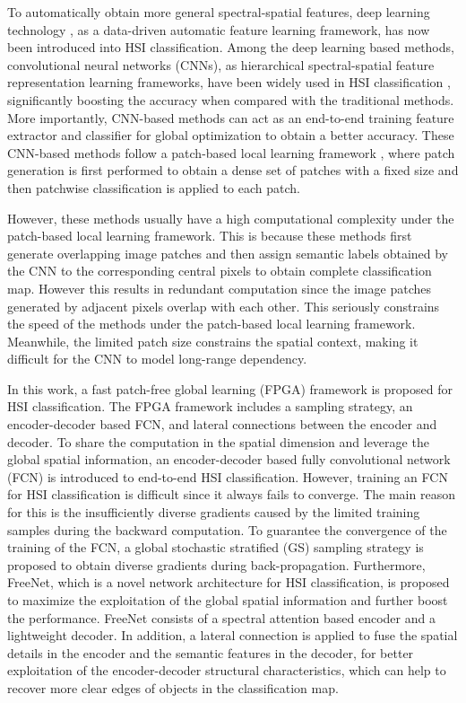 \documentclass[journal]{IEEEtran}
\begin{document}
To automatically obtain more general spectral-spatial features, deep learning technology \cite{lecun2015deep}, as a data-driven automatic feature learning framework, has now been introduced into HSI classification.
Among the deep learning based methods, convolutional neural networks (CNNs), as hierarchical spectral-spatial feature representation learning frameworks, have been widely used in HSI classification \cite{yue2015spectral, hu2015deep, chen2016deep,yu2017convolutional, paoletti2018new}, significantly boosting the accuracy when compared with the traditional methods.
More importantly, CNN-based methods can act as an end-to-end training feature extractor and classifier for global optimization to obtain a better accuracy.
These CNN-based methods follow a patch-based local learning framework \cite{chen2014deep, yue2015spectral,paoletti2018new, xu2018spectral, zhu2018deformable, gong2019cnn,hang2019cascaded}, where patch generation is first performed to obtain a dense set of patches with a fixed size  and then patchwise classification is applied to each patch.


However, these methods usually have a high computational complexity under the patch-based local learning framework.
This is because these methods first generate overlapping image patches and then assign semantic labels obtained by the CNN to the corresponding central pixels to obtain complete classification map.
However this results in redundant computation since the image patches generated by adjacent pixels overlap with each other.
This seriously constrains the speed of the methods under the patch-based local learning framework.
Meanwhile, the limited patch size constrains the spatial context, making it difficult for the CNN to model long-range dependency.



In this work, a fast patch-free global learning (FPGA) framework is proposed for HSI classification.
The FPGA framework includes a sampling strategy, an encoder-decoder based FCN, and lateral connections between the encoder and decoder.
To share the computation in the spatial dimension and leverage the global spatial information, an encoder-decoder based fully convolutional network (FCN) is introduced to end-to-end HSI classification.
However, training an FCN for HSI classification is difficult since it always fails to converge.
The main reason for this is the insufficiently diverse gradients caused by the limited training samples during the backward computation.
To guarantee the convergence of the training of the FCN, a global stochastic stratified (GS) sampling strategy is proposed to obtain diverse gradients during back-propagation.
Furthermore, FreeNet, which is a novel network architecture for HSI classification, is proposed to maximize the exploitation of the global spatial information and further boost the performance.
FreeNet consists of a spectral attention based encoder and a lightweight decoder.
In addition, a lateral connection is applied to fuse the spatial details in the encoder and the semantic features in the decoder, for better exploitation of the encoder-decoder structural characteristics, which can help to recover more clear edges of objects in the classification map.
\end{document}
